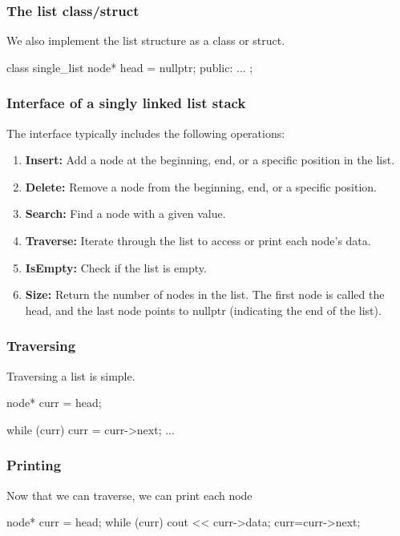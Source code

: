 \documentclass{report}
\begin{document}
    \bigbreak \noindent 
    \subsubsection{The list class/struct}
    \bigbreak \noindent 
    We also implement the list structure as a class or struct.
    \bigbreak \noindent 
    \begin{cppcode}
        class single_list {
            node* head = nullptr;
        public:
            ...
        };
    \end{cppcode}


    \bigbreak \noindent 
    \subsubsection{Interface of a singly linked list stack}
    \bigbreak \noindent 
    The interface typically includes the following operations:
    \begin{enumerate}
        \item \textbf{Insert:} Add a node at the beginning, end, or a specific position in the list.
        \item \textbf{Delete:} Remove a node from the beginning, end, or a specific position.
        \item \textbf{Search:} Find a node with a given value.
        \item \textbf{Traverse:} Iterate through the list to access or print each node's data.
        \item \textbf{IsEmpty:} Check if the list is empty.
        \item \textbf{Size:} Return the number of nodes in the list. The first node is called the head, and the last node points to nullptr (indicating the end of the list).
    \end{enumerate}

    \pagebreak 
    \subsubsection{Traversing}
    \bigbreak \noindent 
    Traversing a list is simple.
    \bigbreak \noindent 
    \begin{cppcode}
    node* curr = head;

    while (curr) {
        curr = curr->next;
        ...
    }
    \end{cppcode}

    \pagebreak 
    \subsubsection{Printing}
    \bigbreak \noindent 
    Now that we can traverse, we can print each node
    \bigbreak \noindent 
    \begin{cppcode}
    node* curr = head;
    while (curr) {
        cout << curr->data;
        curr=curr->next;
    }
    \end{cppcode}
\end{document}
